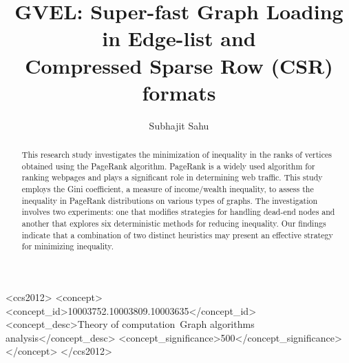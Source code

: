\documentclass[sigconf,nonacm]{acmart}
\begin{document}
\title[GVEL: Super-fast Graph Loading in Edge-list and Compressed Sparse Row (CSR) formats]{GVEL: Super-fast Graph Loading in Edge-list and\\ Compressed Sparse Row (CSR) formats}


\author{Subhajit Sahu}



\begin{abstract}
This research study investigates the minimization of inequality in the ranks of vertices obtained using the PageRank algorithm. PageRank is a widely used algorithm for ranking webpages and plays a significant role in determining web traffic. This study employs the Gini coefficient, a measure of income/wealth inequality, to assess the inequality in PageRank distributions on various types of graphs. The investigation involves two experiments: one that modifies strategies for handling dead-end nodes and another that explores six deterministic methods for reducing inequality. Our findings indicate that a combination of two distinct heuristics may present an effective strategy for minimizing inequality.
\end{abstract}

\begin{CCSXML}
<ccs2012>
<concept>
<concept_id>10003752.10003809.10003635</concept_id>
<concept_desc>Theory of computation~Graph algorithms analysis</concept_desc>
<concept_significance>500</concept_significance>
</concept>
</ccs2012>
\end{CCSXML}


\end{document}
